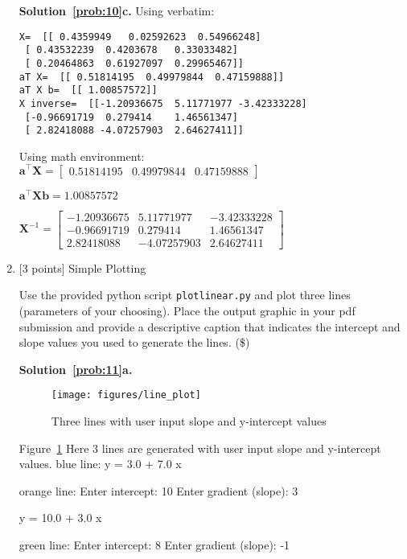 \documentclass[10pt]{article}
\begin{document}
\begin{enumerate}
{\bf Solution~\ref{prob:10}c.} Using verbatim:
\begin{verbatim}
X=  [[ 0.4359949   0.02592623  0.54966248]
 [ 0.43532239  0.4203678   0.33033482]
 [ 0.20464863  0.61927097  0.29965467]]
aT X=  [[ 0.51814195  0.49979844  0.47159888]]
aT X b=  [[ 1.00857572]]
X inverse=  [[-1.20936675  5.11771977 -3.42333228]
 [-0.96691719  0.279414    1.46561347]
 [ 2.82418088 -4.07257903  2.64627411]]
\end{verbatim}
Using math environment:\\
$\mathbf{a}^\top\mathbf{X} = 
\begin{bmatrix}
    0.51814195  &0.49979844  &0.47159888
    \end{bmatrix}$
    
$\mathbf{a}^\top\mathbf{X}\mathbf{b} = 1.00857572$

$\mathbf{X}^{-1} =
\begin{bmatrix}
    -1.20936675 & 5.11771977 &-3.42333228 \\[0.3em]
    -0.96691719  & 0.279414 &   1.46561347\\[0.3em]
    2.82418088 & -4.07257903 & 2.64627411
    \end{bmatrix} $
\\
\item \label{prob:11} [3 points] Simple Plotting

Use the provided python script {\tt plotlinear.py} and plot three lines (parameters of your choosing).  Place the output graphic in your pdf submission and provide a descriptive caption that indicates the intercept and slope values you used to generate the lines. (\$)

{\bf Solution~\ref{prob:11}a.} 

\begin{figure}[htb]
\begin{center}
\texttt{[image: figures/line\_plot]}
\caption{Three lines with user input slope and y-intercept values}
\label{plot1}
\end{center}
\end{figure}

Figure~\ref{plot1} Here 3 lines are generated with user input slope and y-intercept values.
blue line:
y = 3.0 + 7.0 x

orange line:
Enter intercept: 10
Enter gradient (slope): 3

y = 10.0 + 3.0 x

green line:
Enter intercept: 8
Enter gradient (slope): -1


\end{enumerate}
\end{document}
